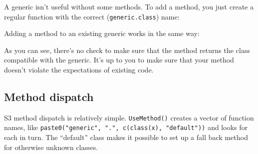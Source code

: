 \begin{Shaded}
\begin{Highlighting}[]
\StringTok{ }\NormalTok{(}\NormalTok{)}
\end{Highlighting}
\end{Shaded}

A generic isn't useful without some methods. To add a method, you just
create a regular function with the correct (\texttt{generic.class})
name: 

\begin{Shaded}
\begin{Highlighting}[]
\StringTok{ }

\StringTok{ }\NormalTok{(}\NormalTok{(), } \NormalTok{)}
\end{Highlighting}
\end{Shaded}

Adding a method to an existing generic works in the same way:

\begin{Shaded}
\begin{Highlighting}[]
\StringTok{ }
\end{Highlighting}
\end{Shaded}

As you can see, there's no check to make sure that the method returns
the class compatible with the generic. It's up to you to make sure that
your method doesn't violate the expectations of existing code.

\subsection{Method dispatch}

S3 method dispatch is relatively simple. \texttt{UseMethod()} creates a
vector of function names, like
\texttt{paste0("generic", ".", c(class(x), "default"))} and looks for
each in turn. The ``default'' class makes it possible to set up a fall
back method for otherwise unknown classes.

